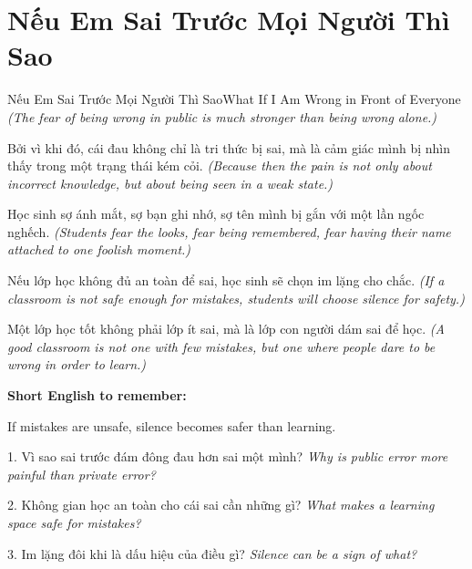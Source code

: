 \section{Nếu Em Sai Trước Mọi Người Thì Sao}
\begin{truyen}{Nếu Em Sai Trước Mọi Người Thì Sao}{What If I Am Wrong in Front of Everyone}
\textit{(The fear of being wrong in public is much stronger than being wrong alone.)}

Bởi vì khi đó, cái đau không chỉ là tri thức bị sai, mà là cảm giác mình bị nhìn thấy trong một trạng thái kém cỏi.
\textit{(Because then the pain is not only about incorrect knowledge, but about being seen in a weak state.)}

Học sinh sợ ánh mắt, sợ bạn ghi nhớ, sợ tên mình bị gắn với một lần ngốc nghếch.
\textit{(Students fear the looks, fear being remembered, fear having their name attached to one foolish moment.)}

Nếu lớp học không đủ an toàn để sai, học sinh sẽ chọn im lặng cho chắc.
\textit{(If a classroom is not safe enough for mistakes, students will choose silence for safety.)}
\end{truyen}

\begin{baihoc}
Một lớp học tốt không phải lớp ít sai, mà là lớp con người dám sai để học.
\textit{(A good classroom is not one with few mistakes, but one where people dare to be wrong in order to learn.)}
\end{baihoc}

\begin{ghinhoanh}
\textbf{Short English to remember:}

If mistakes are unsafe, silence becomes safer than learning.

\end{ghinhoanh}

\begin{tuhocnhanh}
1. Vì sao sai trước đám đông đau hơn sai một mình? \textit{Why is public error more painful than private error?}

2. Không gian học an toàn cho cái sai cần những gì? \textit{What makes a learning space safe for mistakes?}

3. Im lặng đôi khi là dấu hiệu của điều gì? \textit{Silence can be a sign of what?}
\end{tuhocnhanh}
\ngancach

